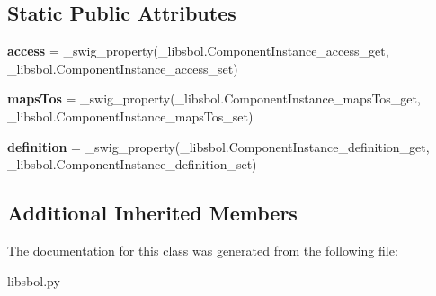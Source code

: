 \subsection*{Static Public Attributes}
\begin{DoxyCompactItemize}
\item 
{\bfseries access} = \+\_\+swig\+\_\+property(\+\_\+libsbol.\+Component\+Instance\+\_\+access\+\_\+get, \+\_\+libsbol.\+Component\+Instance\+\_\+access\+\_\+set)\hypertarget{classsbol_1_1libsbol_1_1_component_instance_a16fa1d797bac6f5e89a0b920cd6986a4}{}\label{classsbol_1_1libsbol_1_1_component_instance_a16fa1d797bac6f5e89a0b920cd6986a4}

\item 
{\bfseries maps\+Tos} = \+\_\+swig\+\_\+property(\+\_\+libsbol.\+Component\+Instance\+\_\+maps\+Tos\+\_\+get, \+\_\+libsbol.\+Component\+Instance\+\_\+maps\+Tos\+\_\+set)\hypertarget{classsbol_1_1libsbol_1_1_component_instance_ad4c4aa7d72960be6e80224714c849e49}{}\label{classsbol_1_1libsbol_1_1_component_instance_ad4c4aa7d72960be6e80224714c849e49}

\item 
{\bfseries definition} = \+\_\+swig\+\_\+property(\+\_\+libsbol.\+Component\+Instance\+\_\+definition\+\_\+get, \+\_\+libsbol.\+Component\+Instance\+\_\+definition\+\_\+set)\hypertarget{classsbol_1_1libsbol_1_1_component_instance_a043086f80356251c30b68b7fc4c34ded}{}\label{classsbol_1_1libsbol_1_1_component_instance_a043086f80356251c30b68b7fc4c34ded}

\end{DoxyCompactItemize}
\subsection*{Additional Inherited Members}


The documentation for this class was generated from the following file\+:\begin{DoxyCompactItemize}
\item 
libsbol.\+py\end{DoxyCompactItemize}

